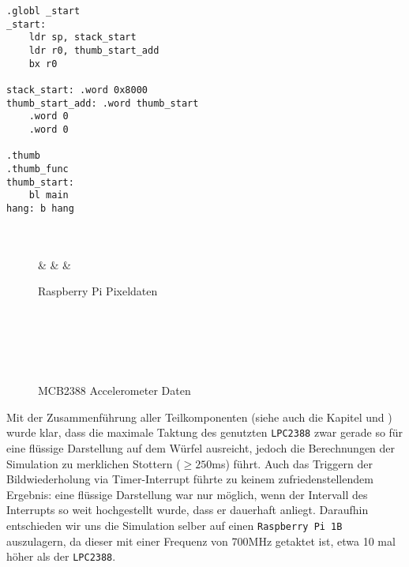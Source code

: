 \begin{lstlisting}[language={[ARM]{Assembler}}, caption={ARM ASM startup code}, label={code.sph.rp.startup}]
.globl _start
_start:
	ldr sp, stack_start
	ldr r0, thumb_start_add
	bx r0

stack_start: .word 0x8000
thumb_start_add: .word thumb_start
	.word 0
	.word 0

.thumb
.thumb_func
thumb_start:
	bl main
hang: b hang

\end{lstlisting}

\begin{figure}
	\begin{bytefield}[bitwidth=1.1em]{32}
		 \\
		 \\
		 &  &  &  \\
	\end{bytefield}
	\caption{Raspberry Pi Pixeldaten}
	\label{fig:sph:rp:pixels}
\end{figure}

\begin{figure}
	\begin{bytefield}[bitwidth=1.1em]{32}
		 \\
		 \\
		 \\
		 \\
	\end{bytefield}
	\caption{MCB2388 Accelerometer Daten}
	\label{fig:sph:rp:acc_data}
\end{figure}

Mit der Zusammenführung aller Teilkomponenten (siehe auch die Kapitel  und ) wurde klar, dass die maximale Taktung des genutzten \texttt{LPC2388} zwar gerade so für eine flüssige Darstellung auf dem Würfel ausreicht, jedoch die Berechnungen der Simulation zu merklichen Stottern ($\geq 250$ms) führt. Auch das Triggern der Bildwiederholung via Timer-Interrupt führte zu keinem zufriedenstellendem Ergebnis: eine flüssige Darstellung war nur möglich, wenn der Intervall des Interrupts so weit hochgestellt wurde, dass er dauerhaft anliegt. Daraufhin entschieden wir uns die Simulation selber auf einen \texttt{Raspberry Pi 1B} auszulagern, da dieser mit einer Frequenz von 700MHz getaktet ist, etwa 10 mal höher als der \texttt{LPC2388}.

